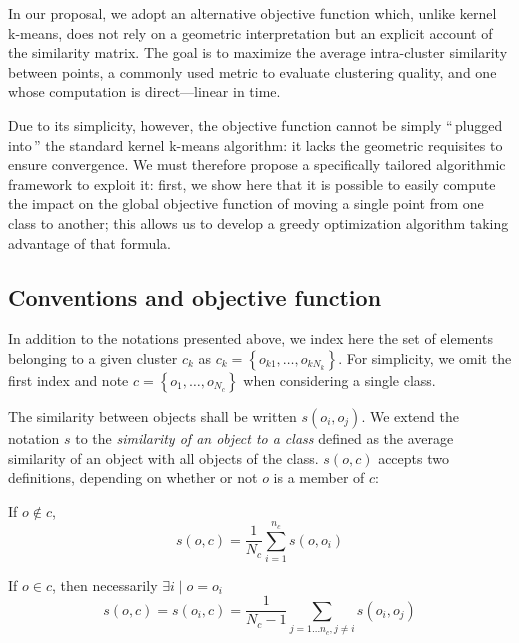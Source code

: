 \documentclass[10pt,letterpaper]{article}
\newcommand{\cad}{---} %
\newcommand{\gl}[1]{``\,#1\,''} %
\begin{document}
In our proposal, we adopt an alternative objective function which, unlike kernel k-means, does not rely on a geometric interpretation but an explicit account of the similarity matrix. The goal is to maximize the average intra-cluster similarity between points, a commonly used metric to evaluate clustering quality, and one whose computation is direct\cad{}linear in time.

Due to its simplicity, however, the objective function cannot be simply \gl{plugged into} the standard kernel k-means algorithm: it lacks the geometric requisites to ensure convergence. We must therefore propose a specifically tailored algorithmic framework to exploit it: first, we show here that it is possible to easily compute the impact on the global objective function of moving a single point from one class to another; this allows us to develop a greedy optimization algorithm taking advantage of that formula.

\subsection{Conventions and objective function}

In addition to the notations presented above, we index here the set of elements belonging to a given cluster $c_k$ as $c_k = \left\{o_{k1}, \ldots, o_{kN_k}\right\}$.
For simplicity, we omit the first index and note $c = \left\{o_1, \ldots, o_{N_c}\right\}$ when considering a single class.

The similarity between objects shall be written $s\left(o_i, o_j\right)$.
We extend the notation $s$ to the \emph{similarity of an object to a
  class} defined as the average similarity of an object
with all objects of the class. $s(o,c)$ accepts two definitions,
depending on whether or not $o$ is a member of $c$:

If $o \notin c$,
\begin{equation}
  s\left(o,c\right) = \frac{1}{N_c} \sum_{i=1}^{n_c}s\left(o, o_i\right)
   \label{eq:soc_notinclass}
\end{equation}

If $o \in c$, then necessarily $\exists i \mid o = o_i$
\begin{equation}
  s\left(o,c\right) = s\left(o_i, c\right) = \frac{1}{N_c-1} \sum_{j=1 \ldots n_c, j \neq i} s\left(o_i, o_j\right)
  	 \label{eq:soc_inclass}
\end{equation}
\end{document}
